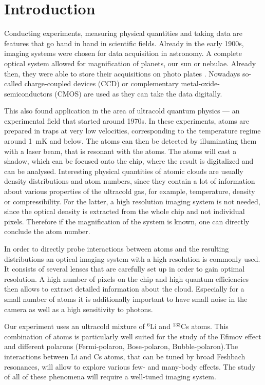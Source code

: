 \chapter{Introduction}
Conducting experiments, measuring physical quantities and taking data are features that go hand in hand in scientific fields. Already in the early 1900s, imaging systems were chosen for data acquisition in astronomy. A complete optical system allowed for magnification of planets, our sun or nebulae. Already then, they were able to store their acquisitions on photo plates \cite{hdaplates}. Nowadays so-called charge-coupled devices (CCD) or complementary metal-oxide-semiconductors (CMOS) are used as they can take the data digitally.

This also found application in the area of ultracold quantum physics --- an experimental field that started around 1970s. In these experiments, atoms are prepared in traps at very low velocities, corresponding to the temperature regime around \SI{1}{\milli\kelvin} and below. The atoms can then be detected by illuminating them with a laser beam, that is resonant with the atoms. The atoms will cast a shadow, which can be focused onto the chip, where the result is digitalized and can be analysed. Interesting physical quantities of atomic clouds are usually density distributions and atom numbers, since they contain a lot of information about various properties of the ultracold gas, for example, temperature, density or compressibility. For the latter, a high resolution imaging system is not needed, since the optical density is extracted from the whole chip and not individual pixels. Therefore if the magnification of the system is known, one can directly conclude the atom number.

In order to directly probe interactions between atoms and the resulting distributions an optical imaging system with a high resolution is commonly used. It consists of several lenses that are carefully set up in order to gain optimal resolution. A high number of pixels on the chip and high quantum efficiencies then allows to extract detailed information about the cloud. Especially for a small number of atoms it is additionally important to have small noise in the camera as well as a high sensitivity to photons.

Our experiment uses an ultracold mixture of $^6$Li and $^{133}$Cs atoms. This combination of atoms is particularly well suited for the study of the Efimov effect \cite{Pires2014,Ulmanis2015,Ulmanis2016} and different polarons\cite{Blinova2013,Massignan2014,Devreese2009} (Fermi-polaron, Bose-polaron, Bubble-polaron).The interactions between Li and Cs atoms, that can be tuned by broad Feshbach resonances, will allow to explore various few- and many-body effects. The study of all of these phenomena will require a well-tuned imaging system.

